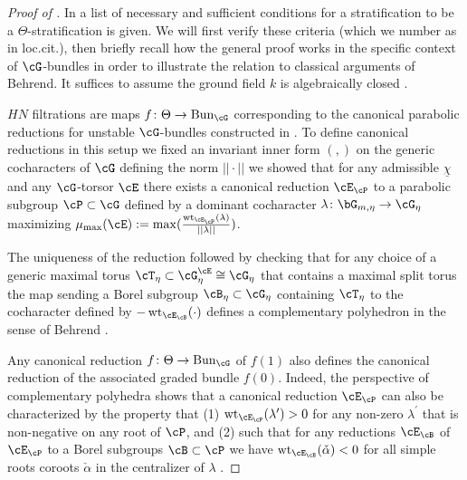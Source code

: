 \documentclass[a4paper]{amsart}
\numberwithin{equation}{section}
\theoremstyle{plain}
\theoremstyle{definition}
\DeclareMathOperator{\Bun}{Bun}
\newcommand{\co}{\colon}
\DeclareMathOperator{\wt}{wt}
\begin{document}
\begin{proof}[Proof of ]


In \cite[Thm.~2.2.2, Simplif.~2.2.3, Simplif.~2.2.4]{hlinstability} a list of necessary and sufficient conditions for a stratification to be a $\Theta$-stratification is given. We will first verify these criteria (which we number as in loc.cit.), then briefly recall how the general proof works in the specific context of $\cG$-bundles in order to illustrate the relation to classical arguments of Behrend. It suffices to assume the ground field $k$ is algebraically closed \cite[Lem.~2.3.3]{hlinstability}.


\medskip
{}
\medskip

$HN$ filtrations are maps $f \co \Theta \to \Bun_\cG$ corresponding to the canonical parabolic reductions for unstable $\cG$-bundles constructed in \cite[Sec.\ 3.F]{heinloth-stability}. To define canonical reductions in this setup we fixed an invariant inner form $(,)$ on the generic cocharacters of $\cG$ defining the norm $||\cdot||$ we showed \cite[Prop.\ 3.6]{heinloth-stability} that for any admissible $\underline{\chi}$ and any $\cG$-torsor $\cE$ there exists a canonical reduction $\cE_{\cP}$ to a parabolic subgroup $\cP\subset \cG$ defined by a dominant cocharacter $\lambda\co \bG_{m,\eta} \to \cG_{\eta}$ maximizing $\mu_{\max}(\cE):= \max(\frac{\wt_{\cE_\cP}(\lambda)}{||\lambda||})$.

The uniqueness of the reduction followed by checking that for any choice of a generic maximal torus $\cT_{\eta}\subset \cG_{\eta}^{\cE} \cong \cG_{\eta}$ that contains a maximal split torus the map sending a Borel subgroup $\cB_{\eta}\subset \cG_{\eta}$ containing $\cT_{\eta}$ to the cocharacter defined by $-\wt_{\cE_{\cB}}(\cdot)$ defines a complementary polyhedron in the sense of Behrend \cite[Def.\ 2.1]{behrend-stability}.
	
\medskip
{}
\medskip

Any canonical reduction $f\co\Theta\to \Bun_{\cG}$ of $f(1)$ also defines the canonical reduction of the associated graded bundle $f(0)$. Indeed, the perspective of complementary polyhedra shows that a canonical reduction $\cE_{\cP}$ can also be characterized by the property that (1) $\wt_{\cE_{\cP}}(\lambda^\prime)>0$ for any non-zero $\lambda^\prime$ that is non-negative on any root of $\cP$, and (2) such that for any reductions $\cE_{\cB}$ of $\cE_{\cP}$ to a Borel subgroups $\cB\subset \cP$ we have $\wt_{\cE_{\cB}}(\check{\alpha}) < 0$ for all simple roots coroots $\check{\alpha}$ in the centralizer of $\lambda$ \cite[Sec. 3]{behrend-stability} \cite[Thm 4.3.2]{heinloth-schmitt}.


\end{proof}
\end{document}
